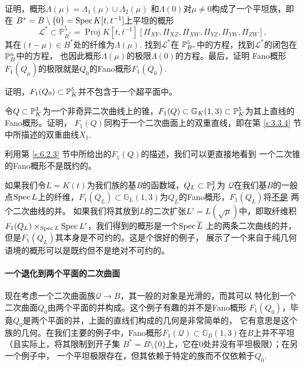 \begin{exe}\label{exe:4.65}
	证明，概形$\Lambda(\mu)=\Lambda_1(\mu)\cup \Lambda_2(\mu)$
	和$\Lambda(0)$对$\mu\neq 0$构成了一个平坦族，即在
	$B^*=B\setminus \{0\}=\spec K[t,t^{-1}]$上平坦的概形
\[
	\mathscr{L}^{*} \subset \mathbb{P}_{B^{*}}^{5}=\operatorname{Proj} K\left[t, t^{-1}\right]\left[\Pi_{X Y}, \Pi_{X Z}, \Pi_{X W}, \Pi_{Y Z}, \Pi_{Y W}, \Pi_{Z W}\right],
\]
	其在$(t-\mu)\in B^*$处的纤维为$\Lambda(\mu)$. 找到$\mathscr L^*$在
	$\P_{B^*}^5$中的方程，找到$\mathscr L^*$的闭包在$\P_B^n$中的方程，
	也因此概形$\Lambda(\mu)$的极限$\Lambda(0)$的方程。最后，证明
	Fano概形$F_1(Q_\mu)$的极限就是$Q_0$的Fano概形$F_1(Q_0)$.
\end{exe}

\begin{exe}\label{exe:6.66}
	证明，$F_1(Q_0)\subset \P_K^5$并不包含于一个超平面中。
\end{exe}

\begin{exe}\label{exe:6.67}
	令$Q\subset \P_K^3$为一个非奇异二次曲线上的锥，$F_1(Q)\subset 
	\mathbb G_K(1,3)\subset \P_K^5$为其上直线的Fano概形。证明，
	$F_1(Q)$同构于一个二次曲面上的双重直线，即在第 \ref{s:3.3.4} 节
	中所描述的双重曲线$X_1$.
\end{exe}

利用第 \ref{s:6.2.3} 节中所给出的$F_1(Q)$的描述，我们可以更直接地看到
一个二次锥的Fano概形不是既约的。

如果我们令$L=K(t)$为我们族的基$B$的函数域，$Q_L\subset \P_L^3$为
$\mathscr Q$在我们基$B$的一般点$\spec L$上的纤维，$F_1(Q_L)\subset 
\mathbb G_L(1,3)$为$Q_L$的Fano概形，$F_1(Q_L)$将\underline{不是}\hspace{-0.8ex}
两个二次曲线的并。
如果我们将其放到$L$的二次扩张$L'=L(\sqrt \mu)$中，即取纤维积
$F_1(Q_L)\times_{\spec L}\spec L'$，我们得到的概形是一个$\spec \overline{L}$
上的两条二次曲线的并，但是$F_1(Q_L)$其本身是不可约的。这是个很好的例子，
展示了一个来自于纯几何语境的概形可以是既约但不是绝对不可约的。

\paragraph*{一个退化到两个平面的二次曲面}
现在考虑一个二次曲面族$\mathscr Q\to B$，其一般的对象是光滑的，而其可以
特化到一个二次曲面$Q_0$由两个平面的并构成。这个例子有趣的并不是Fano概形
$F_1(Q_0)$，毕竟$Q_0$是两个平面的并，上面的直线们构成的几何是非常简单的，
它有意思是这个族的几何。在我们主要的例子中，Fano概形$F_1(\mathscr Q)
\subset \mathbb G_B(1,3)$在$B$上并不平坦（且实际上，将其限制到开子集
$B^*=B\setminus \{0\}$上，它在$0$处并没有平坦极限）；在另一个例子中，
一个平坦极限存在，但其依赖于特定的族而不仅依赖于$Q_0$.

